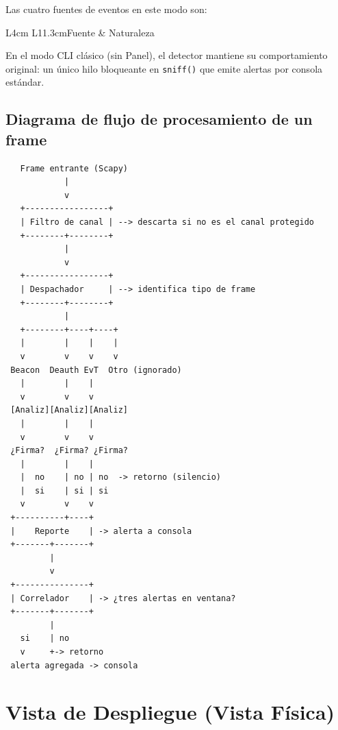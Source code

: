 \documentclass[11pt,a4paper]{article}
\begin{document}
Las cuatro fuentes de eventos en este modo son:

\begin{datatable}{L{4cm} L{11.3cm}}{Fuente & Naturaleza}
\end{datatable}

En el modo CLI clásico (sin Panel), el detector mantiene su comportamiento
original: un único hilo bloqueante en \texttt{sniff()} que emite alertas
por consola estándar.

\subsection{Diagrama de flujo de procesamiento de un frame}

\vspace{0.3cm}
\begin{verbatim}
   Frame entrante (Scapy)
            |
            v
   +-----------------+
   | Filtro de canal | --> descarta si no es el canal protegido
   +--------+--------+
            |
            v
   +-----------------+
   | Despachador     | --> identifica tipo de frame
   +--------+--------+
            |
   +--------+----+----+
   |        |    |    |
   v        v    v    v
 Beacon  Deauth EvT  Otro (ignorado)
   |        |    |
   v        v    v
 [Analiz][Analiz][Analiz]
   |        |    |
   v        v    v
 ¿Firma?  ¿Firma? ¿Firma?
   |        |    |
   |  no    | no | no  -> retorno (silencio)
   |  si    | si | si
   v        v    v
 +----------+----+
 |    Reporte    | -> alerta a consola
 +-------+-------+
         |
         v
 +---------------+
 | Correlador    | -> ¿tres alertas en ventana?
 +-------+-------+
         |
   si    | no
   v     +-> retorno
 alerta agregada -> consola
\end{verbatim}

\section{Vista de Despliegue (Vista Física)}
\end{document}
